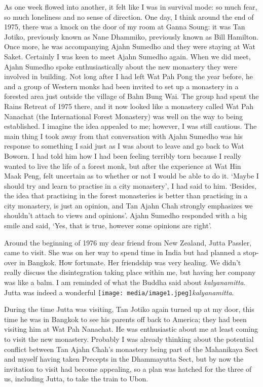 As one week flowed into another, it felt like I was in survival mode: so
much fear, so much loneliness and no sense of direction. One day, I
think around the end of 1975, there was a knock on the door of my room
at Ganna Soung: it was Tan Jotiko, previously known as Nane Dhammiko,
previously known as Bill Hamilton. Once more, he was accompanying Ajahn
Sumedho and they were staying at Wat Saket. Certainly I was keen to meet
Ajahn Sumedho again. When we did meet, Ajahn Sumedho spoke
enthusiastically about the new monastery they were involved in building.
Not long after I had left Wat Pah Pong the year before, he and a group
of Western monks had been invited to set up a monastery in a forested
area just outside the village of Bahn Bung Wai. The group had spent the
Rains Retreat of 1975 there, and it now looked like a monastery called
Wat Pah Nanachat (the International Forest Monastery) was well on the
way to being established. I imagine the idea appealed to me; however, I
was still cautious. The main thing I took away from that conversation
with Ajahn Sumedho was his response to something I said just as I was
about to leave and go back to Wat Boworn. I had told him how I had been
feeling terribly torn because I really wanted to live the life of a
forest monk, but after the experience at Wat Hin Maak Peng, felt
uncertain as to whether or not I would be able to do it. `Maybe I should
try and learn to practise in a city monastery', I had said to him.
`Besides, the idea that practising in the forest monasteries is better
than practising in a city monastery, is just an opinion, and Tan Ajahn
Chah strongly emphasizes we shouldn't attach to views and opinions'.
Ajahn Sumedho responded with a big smile and said, `Yes, that is true,
however some opinions are right'.

Around the beginning of 1976 my dear friend from New Zealand, Jutta
Passler, came to visit. She was on her way to spend time in India but
had planned a stop-over in Bangkok. How fortunate. Her friendship was
very healing. We didn't really discuss the disintegration taking place
within me, but having her company was like a balm. I am reminded of what
the Buddha said about \emph{kalyanamitta}. Jutta was indeed a wonderful
\texttt{[image: media/image1.jpeg]}\emph{kalyanamitta}.

During the time Jutta was visiting, Tan Jotiko again turned up at my
door, this time he was in Bangkok to see his parents off back to
America; they had been visiting him at Wat Pah Nanachat. He was
enthusiastic about me at least coming to visit the new monastery.
Probably I was already thinking about the potential conflict between Tan
Ajahn Chah's monastery being part of the Mahanikaya Sect and myself
having taken Precepts in the Dhammayutta Sect, but by now the invitation
to visit had become appealing, so a plan was hatched for the three of
us, including Jutta, to take the train to Ubon.

